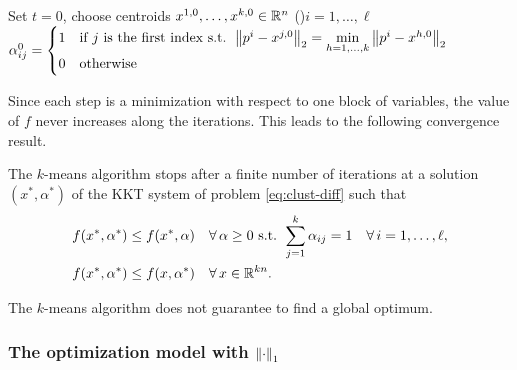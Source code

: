\begin{algorithm}[H]
\caption{$k$-means algorithm}
Set $t = 0$, choose centroids $x^{1,0},\dots,x^{k,0} \in \mathbb{R}^n$\;
\For(){$i=1,\dots,\ell$}{
    $\alpha_{ij}^0 = \begin{cases} 1 & \text{if } j \text{ is the first index s.t. } \left\lVert p^i - x^{j,0} \right\rVert_2 = \min\limits_{h=1,\dots,k} \left\lVert p^i - x^{h,0} \right\rVert_2\\ 0 & \text{otherwise}\end{cases}$\;
}
\end{algorithm}

Since each step is a minimization with respect to one block of variables, the value of $f$ never increases along the iterations. This leads to the following convergence result.

\begin{theorem}
The $k$-means algorithm stops after a finite number of iterations at a solution $(x^*,\alpha^*)$ of the KKT system of problem \eqref{eq:clust-diff} such that
\begin{align*}
f(x^*,\alpha^*) &\le f(x^*,\alpha) && \forall\, \alpha \ge 0 \text{ s.t. } \sum_{j=1}^{k} \alpha_{ij} = 1 \quad \forall\, i=1,\dots,\ell,\\
f(x^*,\alpha^*) &\le f(x,\alpha^*) && \forall\, x \in \mathbb{R}^{kn}.
\end{align*}
\end{theorem}

\begin{remark}
The $k$-means algorithm does not guarantee to find a global optimum.
\end{remark}

\subsubsection{The optimization model with \texorpdfstring{$\left\lVert \cdot \right\rVert_1$}{the 1-norm}}

